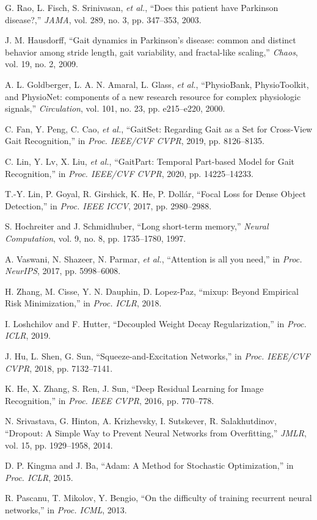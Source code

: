 \documentclass[conference]{IEEEtran}
\begin{document}
\begin{thebibliography}{99}
G. Rao, L. Fisch, S. Srinivasan, \emph{et al.}, ``Does this patient have Parkinson disease?,'' \emph{JAMA}, vol. 289, no. 3, pp. 347--353, 2003.

J. M. Hausdorff, ``Gait dynamics in Parkinson's disease: common and distinct behavior among stride length, gait variability, and fractal-like scaling,'' \emph{Chaos}, vol. 19, no. 2, 2009.

A. L. Goldberger, L. A. N. Amaral, L. Glass, \emph{et al.}, ``PhysioBank, PhysioToolkit, and PhysioNet: components of a new research resource for complex physiologic signals,'' \emph{Circulation}, vol. 101, no. 23, pp. e215--e220, 2000.

C. Fan, Y. Peng, C. Cao, \emph{et al.}, ``GaitSet: Regarding Gait as a Set for Cross-View Gait Recognition,'' in \emph{Proc. IEEE/CVF CVPR}, 2019, pp. 8126--8135.

C. Lin, Y. Lv, X. Liu, \emph{et al.}, ``GaitPart: Temporal Part-based Model for Gait Recognition,'' in \emph{Proc. IEEE/CVF CVPR}, 2020, pp. 14225--14233.

T.-Y. Lin, P. Goyal, R. Girshick, K. He, P. Doll\'ar, ``Focal Loss for Dense Object Detection,'' in \emph{Proc. IEEE ICCV}, 2017, pp. 2980--2988.

S. Hochreiter and J. Schmidhuber, ``Long short-term memory,'' \emph{Neural Computation}, vol. 9, no. 8, pp. 1735--1780, 1997.

A. Vaswani, N. Shazeer, N. Parmar, \emph{et al.}, ``Attention is all you need,'' in \emph{Proc. NeurIPS}, 2017, pp. 5998--6008.

H. Zhang, M. Cisse, Y. N. Dauphin, D. Lopez-Paz, ``mixup: Beyond Empirical Risk Minimization,'' in \emph{Proc. ICLR}, 2018.

I. Loshchilov and F. Hutter, ``Decoupled Weight Decay Regularization,'' in \emph{Proc. ICLR}, 2019.

J. Hu, L. Shen, G. Sun, ``Squeeze-and-Excitation Networks,'' in \emph{Proc. IEEE/CVF CVPR}, 2018, pp. 7132--7141.

K. He, X. Zhang, S. Ren, J. Sun, ``Deep Residual Learning for Image Recognition,'' in \emph{Proc. IEEE CVPR}, 2016, pp. 770--778.

N. Srivastava, G. Hinton, A. Krizhevsky, I. Sutskever, R. Salakhutdinov, ``Dropout: A Simple Way to Prevent Neural Networks from Overfitting,'' \emph{JMLR}, vol. 15, pp. 1929--1958, 2014.

D. P. Kingma and J. Ba, ``Adam: A Method for Stochastic Optimization,'' in \emph{Proc. ICLR}, 2015.

R. Pascanu, T. Mikolov, Y. Bengio, ``On the difficulty of training recurrent neural networks,'' in \emph{Proc. ICML}, 2013.
\end{thebibliography}

\balance
\end{document}
